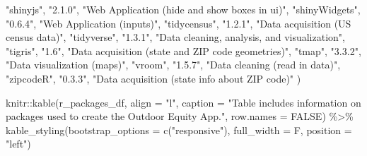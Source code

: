 \documentclass[
  11 pt,
  openany]{book}
\newenvironment{Shaded}{\begin{snugshade}}{\end{snugshade}}
\newcommand{\AttributeTok}[1]{\textcolor[rgb]{0.77,0.63,0.00}{#1}}
\newcommand{\ConstantTok}[1]{\textcolor[rgb]{0.00,0.00,0.00}{#1}}
\newcommand{\FunctionTok}[1]{\textcolor[rgb]{0.00,0.00,0.00}{#1}}
\newcommand{\NormalTok}[1]{#1}
\newcommand{\SpecialCharTok}[1]{\textcolor[rgb]{0.00,0.00,0.00}{#1}}
\newcommand{\StringTok}[1]{\textcolor[rgb]{0.31,0.60,0.02}{#1}}
\begin{document}
\begin{Shaded}
\begin{Highlighting}[]
    \StringTok{"shinyjs"}\NormalTok{, }\StringTok{"2.1.0"}\NormalTok{, }\StringTok{"Web Application (hide and show boxes in ui)"}\NormalTok{,}
    \StringTok{"shinyWidgets"}\NormalTok{, }\StringTok{"0.6.4"}\NormalTok{, }\StringTok{"Web Application (inputs)"}\NormalTok{,}
    \StringTok{"tidycensus"}\NormalTok{, }\StringTok{"1.2.1"}\NormalTok{, }\StringTok{"Data acquisition (US census data)"}\NormalTok{,}
    \StringTok{"tidyverse"}\NormalTok{, }\StringTok{"1.3.1"}\NormalTok{, }\StringTok{"Data cleaning, analysis, and visualization"}\NormalTok{,}
    \StringTok{"tigris"}\NormalTok{, }\StringTok{"1.6"}\NormalTok{, }\StringTok{"Data acquisition (state and ZIP code geometries)"}\NormalTok{,}
    \StringTok{"tmap"}\NormalTok{, }\StringTok{"3.3.2"}\NormalTok{, }\StringTok{"Data visualization (maps)"}\NormalTok{,}
    \StringTok{"vroom"}\NormalTok{, }\StringTok{"1.5.7"}\NormalTok{, }\StringTok{"Data cleaning (read in data)"}\NormalTok{,}
    \StringTok{"zipcodeR"}\NormalTok{, }\StringTok{"0.3.3"}\NormalTok{, }\StringTok{"Data acquisition (state info about ZIP code)"}
\NormalTok{  )}

\NormalTok{knitr}\SpecialCharTok{::}\FunctionTok{kable}\NormalTok{(r\_packages\_df,}
             \AttributeTok{align =} \StringTok{"l"}\NormalTok{,}
             \AttributeTok{caption =} \StringTok{"Table includes information on packages used to create the Outdoor Equity App."}\NormalTok{,}
             \AttributeTok{row.names =} \ConstantTok{FALSE}\NormalTok{) }\SpecialCharTok{\%\textgreater{}\%} 
  \FunctionTok{kable\_styling}\NormalTok{(}\AttributeTok{bootstrap\_options =} \FunctionTok{c}\NormalTok{(}\StringTok{"responsive"}\NormalTok{), }\AttributeTok{full\_width =}\NormalTok{ F, }\AttributeTok{position =} \StringTok{"left"}\NormalTok{)}
\end{Highlighting}
\end{Shaded}
\end{document}
